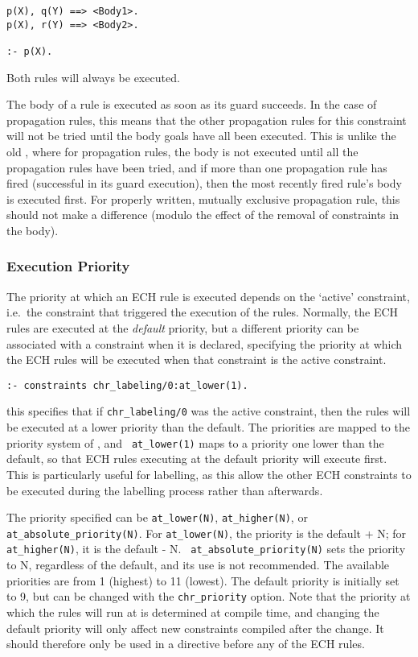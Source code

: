 \begin{verbatim}
p(X), q(Y) ==> <Body1>.
p(X), r(Y) ==> <Body2>.

:- p(X).
\end{verbatim}

Both rules will always be executed.

The body of a rule is executed as soon as its guard succeeds. In the case
of propagation rules, this means that the other propagation rules for this
constraint will not be tried until the body goals have all been executed.
This is
unlike the old \chr, where for propagation rules, the body is not executed
until all the propagation rules have been tried, and if more than one
propagation rule has fired (successful in its guard execution), then the
most recently fired rule's body is executed first. For properly written,
mutually exclusive propagation rule, this should not make a difference
(modulo the effect of the removal of constraints in the body).

\subsubsection{Execution Priority}

The priority at which an ECH rule is executed depends on the `active'
constraint, i.e.\ the constraint that triggered the execution of the
rules. Normally, the ECH rules are executed at the {\it default\/}
priority, but a different priority can be associated with a constraint when it
is declared, specifying the priority at which the ECH rules will be executed
when that constraint is the active constraint. 

\begin{verbatim}
:- constraints chr_labeling/0:at_lower(1).
\end{verbatim}

\noindent
this specifies that if {\tt chr_labeling/0} was the active constraint, then 
the rules will be executed at a lower priority than the default. The
priorities are mapped to the priority system of {\eclipse}, and {\tt
at_lower(1)} maps to a priority one lower than the default, so that ECH
rules executing at the default priority will execute first. This is
particularly useful for labelling, as this allow the other ECH constraints
to be executed during the labelling process rather than afterwards.

The priority specified can be {\tt at_lower(N)}, {\tt at_higher(N)}, or
{\tt at_absolute_priority(N)}. For {\tt at_lower(N)}, the priority is the
default + N; for {\tt at_higher(N)}, it is the default - N. {\tt
at_absolute_priority(N)} sets the priority to N, regardless of the default,
and its use is not recommended. The available priorities are from 1
(highest) to 11 (lowest). The default priority is initially set to 9, but
can be changed with the {\tt chr_priority} option. Note that the priority
at which the rules will run at is determined at compile time, and changing
the default priority will only affect new constraints compiled after the
change. It should therefore only be used in a directive before any of the
ECH rules.

